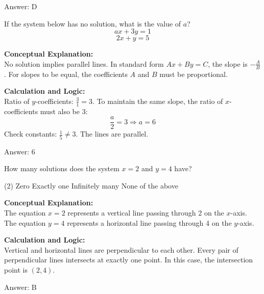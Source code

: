 \documentclass[11pt,paper=a4,answers]{exam}
\begin{document}
\begin{questions}
\begin{solution}
\vspace{15pt}
Answer: \colorbox{yellow!100}{D}
\end{solution}

\question
If the system below has no solution, what is the value of $a$?
\[ ax + 3y = 1 \]
\[ 2x + y = 5 \]

\begin{solution}
\textbf{Conceptual Explanation:} \\
No solution implies parallel lines. In standard form $Ax + By = C$, the slope is $-\frac{A}{B}$. For slopes to be equal, the coefficients $A$ and $B$ must be proportional.

\vspace{10pt}
\textbf{Calculation and Logic:} \\
Ratio of $y$-coefficients: $\frac{3}{1} = 3$.
To maintain the same slope, the ratio of $x$-coefficients must also be 3:
\[ \frac{a}{2} = 3 \Rightarrow a = 6 \]
Check constants: $\frac{1}{5} \neq 3$. The lines are parallel.

\vspace{15pt}
Answer: \colorbox{yellow!100}{6}
\end{solution}

\question
How many solutions does the system $x = 2$ and $y = 4$ have?
\begin{tasks}(2)
    \task Zero
    \task Exactly one
    \task Infinitely many
    \task None of the above
\end{tasks}

\begin{solution}
\textbf{Conceptual Explanation:} \\
The equation $x = 2$ represents a vertical line passing through 2 on the $x$-axis. The equation $y = 4$ represents a horizontal line passing through 4 on the $y$-axis.

\vspace{10pt}
\textbf{Calculation and Logic:} \\
Vertical and horizontal lines are perpendicular to each other. Every pair of perpendicular lines intersects at exactly one point. In this case, the intersection point is $(2, 4)$.

\vspace{15pt}
Answer: \colorbox{yellow!100}{B}
\end{solution}


\end{questions}
\end{document}
